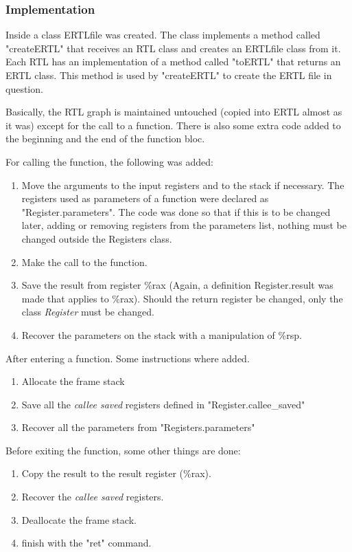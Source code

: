 \documentclass[conference]{IEEEtran}
\theoremstyle{definition}
\begin{document}
\subsubsection{Implementation} \label{sec:ERTL-implementation}

Inside a class ERTLfile was created. The class implements a method called "createERTL" that receives an RTL class and creates an ERTLfile class from it. Each RTL has an implementation of a method called "toERTL" that returns an ERTL class. This method is used by "createERTL" to create the ERTL file in question.

Basically, the RTL graph is maintained untouched (copied into ERTL almost as it was) except for the call to a function. There is also some extra code added to the beginning and the end of the function bloc.

For calling the function, the following was added:

\begin{enumerate}
	\item Move the arguments to the input registers and to the stack if necessary. The registers used as parameters of a function were declared as "Register.parameters". The code was done so that if this is to be changed later, adding or removing registers from the parameters list, nothing must be changed outside the Registers class. 
	\item Make the call to the function.
	\item Save the result from register \%rax (Again, a definition Register.result was made that applies to \%rax). Should the return register be changed, only the class \textit{Register} must be changed.
	\item Recover the parameters on the stack with a manipulation of \%rsp.
\end{enumerate}

After entering a function. Some instructions where added.

\begin{enumerate}
	\item Allocate the frame stack
	\item Save all the \textit{callee saved} registers defined in "Register.callee\_saved"
	\item Recover all the parameters from "Registers.parameters"
\end{enumerate}

Before exiting the function, some other things are done:

\begin{enumerate}
	\item Copy the result to the result register (\%rax).
	\item Recover the \textit{callee saved} registers.
	\item Deallocate the frame stack.
	\item finish with the "ret" command.
\end{enumerate}
\end{document}

